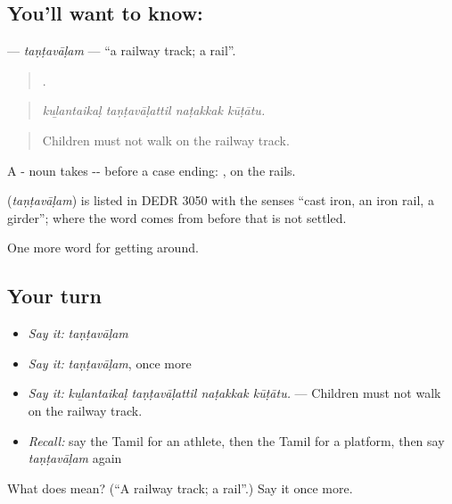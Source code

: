 \subsection*{You'll want to know: }
\textbf{} — \emph{taṇṭavāḷam} — \textquotedblleft{}a railway track; a rail\textquotedblright{}.

\begin{quote}
   .
\end{quote}

\begin{quote}
\emph{kuḻantaikaḷ taṇṭavāḷattil naṭakkak kūṭātu.}
\end{quote}

\begin{quote}
Children must not walk on the railway track.
\end{quote}

A - noun takes -- before a case ending: , on the rails.

\begin{cousinweb}
\textbf{} (\emph{taṇṭavāḷam}) is listed in DEDR 3050 with the senses \textquotedblleft{}cast iron, an iron rail, a girder\textquotedblright{}; where the word comes from before that is not settled.
\end{cousinweb}

\begin{grammarlens}[title={What you've built}]
One more word for getting around.
\end{grammarlens}

\subsection*{Your turn}
\begin{itemize}
\raggedright
  \item \emph{Say it:} \emph{taṇṭavāḷam}
  \item \emph{Say it:} \emph{taṇṭavāḷam}, once more
  \item \emph{Say it:} \emph{kuḻantaikaḷ taṇṭavāḷattil naṭakkak kūṭātu.} — Children must not walk on the railway track.
  \item \emph{Recall:} say the Tamil for an athlete, then the Tamil for a platform, then say \emph{taṇṭavāḷam} again
\end{itemize}

\begin{tcolorbox}[breakable,colback=teal!4,colframe=teal!35!black,title={Before you move on}]
What does  mean? (\textquotedblleft{}A railway track; a rail\textquotedblright{}.) Say it once more.
\end{tcolorbox}
